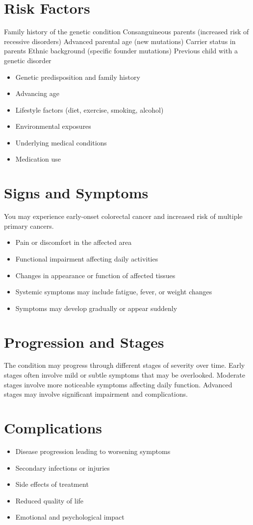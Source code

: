 \section{Risk Factors}
Family history of the genetic condition Consanguineous parents (increased risk of recessive disorders) Advanced parental age (new mutations) Carrier status in parents Ethnic background (specific founder mutations) Previous child with a genetic disorder

\begin{itemize}[noitemsep]
  \item Genetic predisposition and family history
  \item Advancing age
  \item Lifestyle factors (diet, exercise, smoking, alcohol)
  \item Environmental exposures
  \item Underlying medical conditions
  \item Medication use
\end{itemize}
\section{Signs and Symptoms}
You may experience early-onset colorectal cancer and increased risk of multiple primary cancers.

\begin{itemize}[noitemsep]
  \item Pain or discomfort in the affected area
  \item Functional impairment affecting daily activities
  \item Changes in appearance or function of affected tissues
  \item Systemic symptoms may include fatigue, fever, or weight changes
  \item Symptoms may develop gradually or appear suddenly
\end{itemize}
\section{Progression and Stages}
The condition may progress through different stages of severity over time. Early stages often involve mild or subtle symptoms that may be overlooked. Moderate stages involve more noticeable symptoms affecting daily function. Advanced stages may involve significant impairment and complications.
\section{Complications}
\begin{itemize}[noitemsep]
  \item Disease progression leading to worsening symptoms
  \item Secondary infections or injuries
  \item Side effects of treatment
  \item Reduced quality of life
  \item Emotional and psychological impact
\end{itemize}
